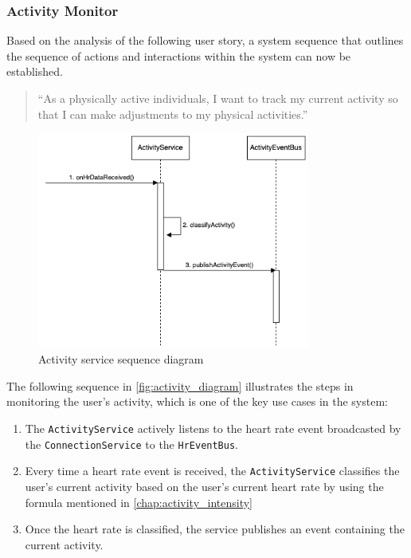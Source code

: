 \subsubsection{Activity Monitor}
\label{chap:activity_monitor_design}
Based on the analysis of the following user story, a system sequence that outlines the sequence of actions and interactions within the system can now be established.
\begin{quotation}
    \enquote{As a physically active individuals, I want to track my current activity so that I can make adjustments to my physical activities.} 
\end{quotation}

\begin{figure}[H]
    \centering
    \includegraphics[width=0.8\textwidth]{diagrams/activity-monitor-seq.drawio.png}
    \caption{Activity service sequence diagram}
    \label{fig:activity_diagram}
\end{figure}

The following sequence in \autoref{fig:activity_diagram} illustrates the steps in monitoring the user's activity, which is one of the key use cases in the system:
\begin{enumerate}
    \item The \texttt{ActivityService} actively listens to the heart rate event broadcasted by the \texttt{ConnectionService} to the \texttt{HrEventBus}.
    \item Every time a heart rate event is received, the \texttt{ActivityService} classifies the user's current activity based on the user's current heart rate by using the formula mentioned in \autoref{chap:activity_intensity}
    \item Once the heart rate is classified, the service publishes an event containing the current activity.
\end{enumerate}

